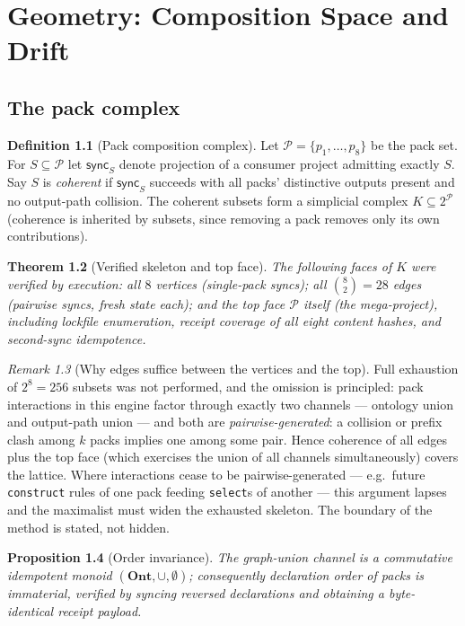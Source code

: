 \documentclass[11pt,a4paper]{report}
\newtheorem{theorem}{Theorem}[chapter]
\newtheorem{proposition}[theorem]{Proposition}
\theoremstyle{definition}
\newtheorem{definition}[theorem]{Definition}
\theoremstyle{remark}
\newtheorem{remark}[theorem]{Remark}
\newcommand{\Ont}{\mathbf{Ont}}
\newcommand{\sync}{\mathsf{sync}}
\newcommand{\Packs}{\mathcal{P}}
\begin{document}
\chapter{Geometry: Composition Space and Drift}

\section{The pack complex}

\begin{definition}[Pack composition complex]\label{def:complex}
Let $\Packs = \{p_1,\dots,p_8\}$ be the pack set. For $S \subseteq \Packs$
let $\sync_S$ denote projection of a consumer project admitting exactly $S$.
Say $S$ is \emph{coherent} if $\sync_S$ succeeds with all packs' distinctive
outputs present and no output-path collision. The coherent subsets form a
simplicial complex $K \subseteq 2^{\Packs}$ (coherence is inherited by
subsets, since removing a pack removes only its own contributions).
\end{definition}

\begin{theorem}[Verified skeleton and top face]\label{thm:complex}
The following faces of $K$ were verified by execution:
all $8$ vertices (single-pack syncs); all $\binom{8}{2} = 28$ edges
(pairwise syncs, fresh state each); and the top face $\Packs$ itself
(the mega-project), including lockfile enumeration, receipt coverage of all
eight content hashes, and second-sync idempotence.
\end{theorem}

\begin{remark}[Why edges suffice between the vertices and the top]
Full exhaustion of $2^{8} = 256$ subsets was not performed, and the omission
is principled: pack interactions in this engine factor through exactly two
channels --- ontology union and output-path union --- and both are
\emph{pairwise-generated}: a collision or prefix clash among $k$ packs
implies one among some pair. Hence coherence of all edges plus the top face
(which exercises the union of all channels simultaneously) covers the lattice.
Where interactions cease to be pairwise-generated --- e.g.\ future
\texttt{construct} rules of one pack feeding \texttt{select}s of another ---
this argument lapses and the maximalist must widen the exhausted skeleton.
The boundary of the method is stated, not hidden.
\end{remark}

\begin{proposition}[Order invariance]
The graph-union channel is a commutative idempotent monoid
$(\Ont, \cup, \emptyset)$; consequently declaration order of packs is
immaterial, verified by syncing reversed declarations and obtaining a
byte-identical receipt payload.
\end{proposition}
\end{document}
